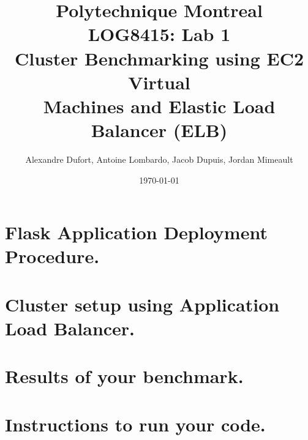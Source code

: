 \documentclass{article}
\title{Polytechnique Montreal\\
LOG8415: Lab 1\\
Cluster Benchmarking using EC2 Virtual\\
Machines and Elastic Load Balancer (ELB)
}
\author{Alexandre Dufort, Antoine Lombardo, Jacob Dupuis, Jordan Mimeault} %
\date{\today} %
\begin{document}
    \maketitle %
    
    \section{Flask	Application	Deployment	Procedure.} %
    \section{Cluster	setup	using	Application	Load	Balancer.} %
    \section{Results	of	your	benchmark.	} %
    \section{Instructions	to	run	your	code.	} %
    
    
\end{document}
